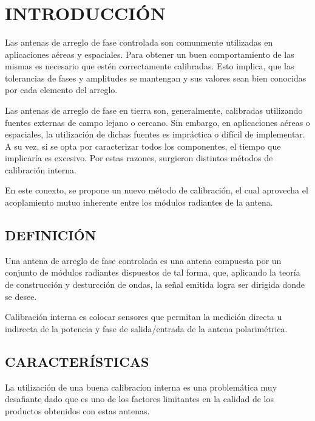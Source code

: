 \documentclass[a4paper,10pt]{article}
\title{  }
\begin{document}
	\maketitle %
	
	\tableofcontents %
	\newpage

	\section{INTRODUCCIÓN}
		Las antenas de arreglo de fase controlada son comunmente utilizadas en 
	aplicaciones aéreas y espaciales. Para obtener un buen comportamiento de las
	mismas es necesario que estén correctamente calibradas. Esto implica, que 
	las tolerancias de fases y amplitudes se mantengan y sus valores sean bien 
	conocidas por cada elemento del arreglo.
	
		Las antenas de arreglo de fase en tierra son, generalmente, calibradas
	utilizando fuentes externas de campo lejano o cercano. Sin embargo, en 
	aplicaciones aéreas o espaciales, la utilización de dichas fuentes es 
	impráctica o difícil de implementar. A su vez, si se opta por caracterizar
	todos los componentes, el tiempo que implicaría es excesivo. Por estas 
	razones, surgieron distintos métodos de calibración interna.

		En este conexto, se propone un nuevo método de calibración, el cual 
	aprovecha el acoplamiento mutuo inherente entre los módulos radiantes de la 
	antena.

	\subsection{DEFINICIÓN}
		Una antena de arreglo de fase controlada es una antena compuesta por un
	conjunto de módulos radiantes dispuestos de tal forma, que, aplicando la
	teoría de construcción y desturcción de ondas, la señal emitida logra ser 
	dirigida donde se desee.
		
		Calibración interna es colocar sensores que permitan la medición directa
	u indirecta de la potencia y fase de salida/entrada de la antena 
	polarimétrica.
		
	\subsection{CARACTERÍSTICAS}
		La utilización de una buena calibracíon interna es una problemática muy
	desafiante dado que es uno de los factores limitantes en la calidad de los 
	productos obtenidos con estas antenas.
\end{document}
